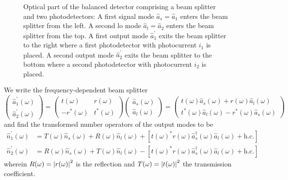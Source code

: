 
\begin{figure}[htb]
    \centering
    
    \caption{Optical part of the balanced detector comprising a beam splitter and two photodetectors: A first signal mode $\hat{a}_s=\hat{a}_1$ enters the beam splitter from the left. A second \gls{lo} mode $\hat{a}_l=\hat{a}_2$ enters the beam splitter from the top. A first output mode $\hat{a}_1^\prime$ exits the beam splitter to the right where a first photodetector with photocurrent $i_1$ is placed. A second output mode $\hat{a}_2^\prime$ exits the beam splitter to the bottom where a second photodetector with photocurrent $i_2$ is placed.}\label{fig:balanced_detector_optics}
\end{figure}

We write the frequency-dependent beam splitter \cite[p.~207]{Vogel2006}
\begin{equation}
	\begin{pmatrix}
		\hat{a}_1^\prime(\omega) \\
		\hat{a}_2^\prime(\omega)
	\end{pmatrix}
	=
	\begin{pmatrix}
		t(\omega) & r(\omega) \\
		-r^*(\omega) & t^*(\omega)
	\end{pmatrix}
	\begin{pmatrix}
		\hat{a}_s(\omega) \\
		\hat{a}_l(\omega)
	\end{pmatrix}
	=
	\begin{pmatrix}
		t(\omega)\hat{a}_s(\omega) + r(\omega)\hat{a}_l(\omega) \\
		t^*(\omega)\hat{a}_l(\omega) - r^*(\omega)\hat{a}_s(\omega)
	\end{pmatrix}
\end{equation}
and find the transformed number operators of the output modes to be
\begin{align}
	\hat{n}_1^\prime(\omega)
	&=
	T(\omega)
	\hat{n}_s(\omega)
	+
	R(\omega)
	\hat{n}_l(\omega)
	+
	\left[
		t(\omega)^*
		r(\omega)
		\hat{a}_s^\dagger(\omega)
		\hat{a}_l(\omega)
		+
		\text{h.c.}
	\right]
	\\
	\hat{n}_2^\prime(\omega)
	&=
	R(\omega)
	\hat{n}_s(\omega)
	+
	T(\omega)
	\hat{n}_l(\omega)
	-
	\left[
		t(\omega)^*
		r(\omega)
		\hat{a}_s^\dagger(\omega)
		\hat{a}_l(\omega)
		+
		\text{h.c.}
	\right]
\end{align}
wherein $R(\omega)=\abs{r(\omega)}^2$ is the reflection and $T(\omega)=\abs{t(\omega)}^2$ the transmission coefficient.

